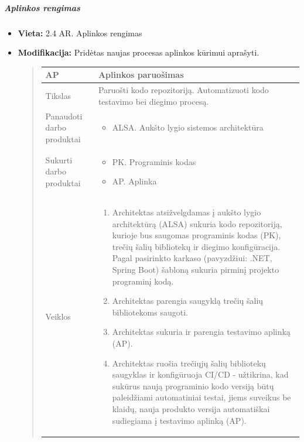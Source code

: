 \documentclass{article}
\begin{document}
\subparagraph{Aplinkos rengimas}
\begin{itemize}
    \item \textbf{Vieta:} 2.4 AR. Aplinkos rengimas 
    \item \textbf{Modifikacija:} Pridėtas naujas procesas aplinkos kūrimui aprašyti. 

    \begin{quote}
    \begin{longtable}{p{}|p{}}
        AP & Aplinkos paruošimas \\ \hline
        Tikslas & Paruošti kodo repozitoriją. Automatizuoti kodo testavimo bei diegimo procesą. \\ \hline
        Panaudoti darbo produktai & \begin{itemize}
            \item ALSA. Aukšto lygio sistemos architektūra
        \end{itemize} \\ \hline
        Sukurti darbo produktai &
        \begin{itemize}
            \item PK. Programinis kodas
            \item AP. Aplinka
        \end{itemize}
        \\ \hline
        Veiklos & \begin{enumerate}
            \item Architektas atsižvelgdamas į aukšto lygio architektūrą (ALSA) sukuria kodo repozitoriją, kurioje bus saugomas programinis kodas (PK), trečių šalių bibliotekų ir diegimo konfigūracija. Pagal pasirinkto karkaso (pavyzdžiui: .NET, Spring Boot) šabloną  sukuria pirminį projekto programinį kodą.
    
            \item Architektas parengia saugyklą trečių šalių bibliotekoms saugoti.
    
            \item Architektas sukuria ir parengia testavimo aplinką (AP).
    
            \item Architektas ruošia trečiųjų šalių bibliotekų saugyklas ir konfigūruoja CI/CD - užtikrina, kad sukūrus naują programinio kodo versiją būtų paleidžiami automatiniai testai, jiems suveikus be klaidų, nauja produkto versija automatiškai sudiegiama į testavimo aplinką (AP).
       \end{enumerate}
    \end{longtable}
    \end{quote}
\end{itemize}
\end{document}
